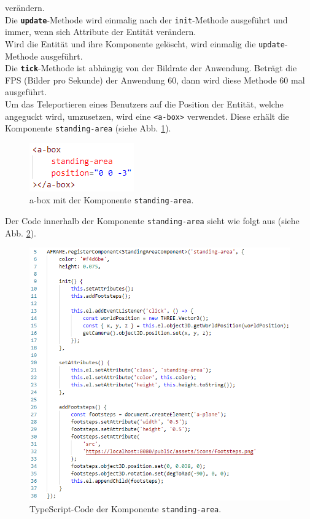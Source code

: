 \documentclass[a4paper,12pt,oneside]{article}
\begin{document}
        verändern. \\
        Die \texttt{\textbf{update}}-Methode wird einmalig nach der
        \texttt{init}-Methode ausgeführt und immer, wenn sich Attribute
        der Entität verändern. \\
        Wird die Entität und ihre Komponente gelöscht, wird einmalig
        die \texttt{update}-Methode ausgeführt. \\
        Die \texttt{\textbf{tick}}-Methode ist abhängig von der Bildrate der
        Anwendung. Beträgt die FPS (Bilder pro
        Sekunde) der Anwendung 60, dann wird diese Methode 60 mal ausgeführt. \\
        Um das Teleportieren eines Benutzers auf die Position der Entität, 
        welche angeguckt wird, umzusetzen, wird eine \texttt{<a-box>}
        verwendet. Diese erhält die Komponente \texttt{standing-area}
        (siehe Abb. \ref{fig:standing-area1}).
        \begin{figure}[h]
          \centering
          \includegraphics{img/coding/standing-area1.png}
          \caption{a-box mit der Komponente \texttt{standing-area}.}
          \label{fig:standing-area1}
        \end{figure}
        Der Code innerhalb der Komponente \texttt{standing-area} sieht
        wie folgt aus (siehe Abb. \ref{fig:standing-area2}).
        \begin{figure}
          \centering
          \includegraphics{img/coding/standing-area2.png}
          \caption{TypeScript-Code der Komponente \texttt{standing-area}.}
          \label{fig:standing-area2}
        \end{figure}
\end{document}
